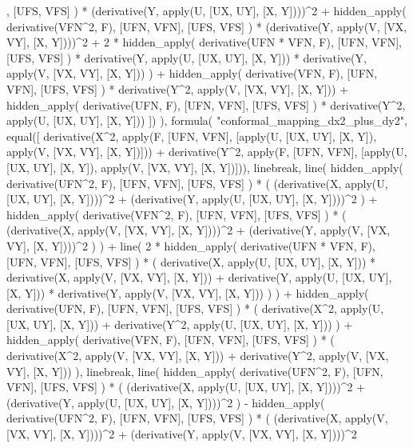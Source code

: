 \begin{prolog}
							,
							[UFS, VFS]
						) * (derivative(Y, apply(U, [UX, UY], [X, Y])))^2 +
						hidden_apply(
							derivative(VFN^2, F),
							[UFN, VFN],
							[UFS, VFS]
						) * (derivative(Y, apply(V, [VX, VY], [X, Y])))^2 +
						2 * hidden_apply(
							derivative(UFN * VFN, F),
							[UFN, VFN],
							[UFS, VFS]
						) * derivative(Y, apply(U, [UX, UY], [X, Y])) * derivative(Y, apply(V, [VX, VY], [X, Y]))
					) +
					hidden_apply(
						derivative(VFN, F),
						[UFN, VFN],
						[UFS, VFS]
					) * derivative(Y^2, apply(V, [VX, VY], [X, Y])) +
					hidden_apply(
						derivative(UFN, F),
						[UFN, VFN],
						[UFS, VFS]
					) * derivative(Y^2, apply(U, [UX, UY], [X, Y]))
				])
			),
			formula(
				"conformal_mapping_dx2_plus_dy2",
				equal([
					derivative(X^2, apply(F, [UFN, VFN], [apply(U, [UX, UY], [X, Y]), apply(V, [VX, VY], [X, Y])])) +
					derivative(Y^2, apply(F, [UFN, VFN], [apply(U, [UX, UY], [X, Y]), apply(V, [VX, VY], [X, Y])])),
					linebreak,
					line(
						hidden_apply(
							derivative(UFN^2, F),
							[UFN, VFN],
							[UFS, VFS]
						) * (
							(derivative(X, apply(U, [UX, UY], [X, Y])))^2 +
							(derivative(Y, apply(U, [UX, UY], [X, Y])))^2
						) +
						hidden_apply(
							derivative(VFN^2, F),
							[UFN, VFN],
							[UFS, VFS]
						) * (
							(derivative(X, apply(V, [VX, VY], [X, Y])))^2 +
							(derivative(Y, apply(V, [VX, VY], [X, Y])))^2
						)
					) +
					line(
						2 * hidden_apply(
							derivative(UFN * VFN, F),
							[UFN, VFN],
							[UFS, VFS]
						) * (
							derivative(X, apply(U, [UX, UY], [X, Y])) * derivative(X, apply(V, [VX, VY], [X, Y])) +
							derivative(Y, apply(U, [UX, UY], [X, Y])) * derivative(Y, apply(V, [VX, VY], [X, Y]))
						)
					) +
					hidden_apply(
						derivative(UFN, F),
						[UFN, VFN],
						[UFS, VFS]
					) * (
						derivative(X^2, apply(U, [UX, UY], [X, Y])) +
						derivative(Y^2, apply(U, [UX, UY], [X, Y]))
					) +					
					hidden_apply(
						derivative(VFN, F),
						[UFN, VFN],
						[UFS, VFS]
					) * (
						derivative(X^2, apply(V, [VX, VY], [X, Y])) +
						derivative(Y^2, apply(V, [VX, VY], [X, Y]))
					),
					linebreak,
					line(
						hidden_apply(
							derivative(UFN^2, F),
							[UFN, VFN],
							[UFS, VFS]
						) * (
							(derivative(X, apply(U, [UX, UY], [X, Y])))^2 +
							(derivative(Y, apply(U, [UX, UY], [X, Y])))^2
						) -
						hidden_apply(
							derivative(UFN^2, F),
							[UFN, VFN],
							[UFS, VFS]
						) * (
							(derivative(X, apply(V, [VX, VY], [X, Y])))^2 +
							(derivative(Y, apply(V, [VX, VY], [X, Y])))^2

\end{prolog}
